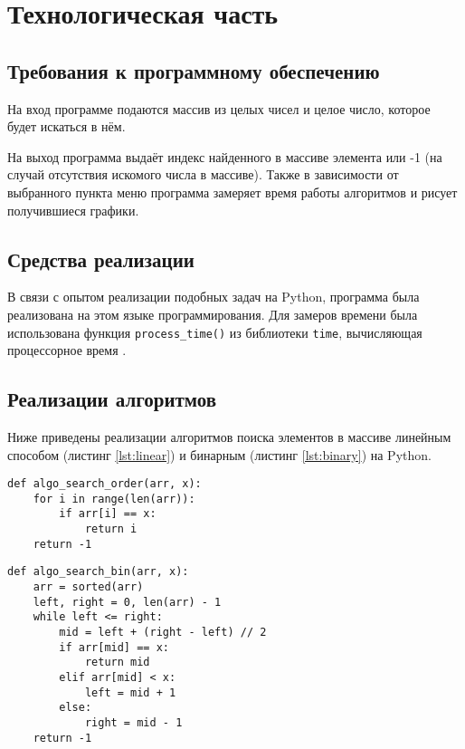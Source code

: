 \section{Технологическая часть}
\subsection{Требования к программному обеспечению}

\hspace{1.20cm}
На вход программе подаются массив из целых чисел и целое число, которое будет искаться в нём.

На выход программа выдаёт индекс найденного в массиве элемента или -1 (на случай отсутствия искомого числа в массиве). Также в зависимости от выбранного пункта меню программа замеряет время работы алгоритмов и рисует получившиеся графики.

\subsection{Средства реализации}

\hspace{1.25cm}
В связи с опытом реализации подобных задач на Python, программа была реализована на этом языке программирования. Для замеров времени была использована функция \texttt{process\_time()} из библиотеки \texttt{time}, вычисляющая процессорное время \cite{process_time}.

\subsection{Реализации алгоритмов}

\hspace{1.25cm}
Ниже приведены реализации алгоритмов поиска элементов в массиве линейным способом (листинг \ref{lst:linear}) и бинарным (листинг \ref{lst:binary}) на Python.

\vspace{0.25cm}
\begin{lstlisting}[caption=реализация линейного алгоритма поиска в массиве, label=lst:linear]
def algo_search_order(arr, x):
    for i in range(len(arr)):
        if arr[i] == x:
            return i
    return -1
\end{lstlisting}

\vspace{0.25cm}
\begin{lstlisting}[caption=реализация бинарного алгоритма поиска в массиве, label=lst:binary]
def algo_search_bin(arr, x):
    arr = sorted(arr)
    left, right = 0, len(arr) - 1
    while left <= right:
        mid = left + (right - left) // 2
        if arr[mid] == x:
            return mid
        elif arr[mid] < x:
            left = mid + 1
        else:
            right = mid - 1
    return -1
\end{lstlisting}

